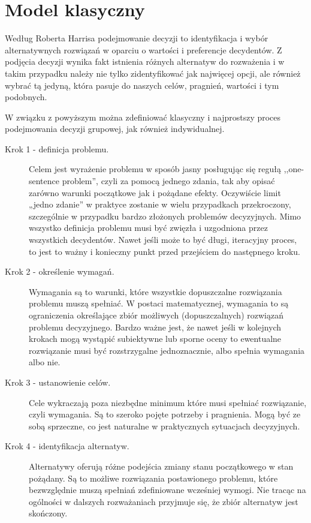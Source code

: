 \section{Model klasyczny}
Według Roberta Harrisa \cite{Harris2012, Harris2002} podejmowanie decyzji to
identyfikacja i wybór alternatywnych rozwiązań w oparciu o wartości i preferencje decydentów. Z
podjęcia decyzji wynika fakt istnienia różnych alternatyw do rozważenia i w
takim przypadku należy nie tylko zidentyfikować jak najwięcej opcji, ale również
wybrać tą jedyną, która pasuje do naszych celów, pragnień, wartości i tym
podobnych.

W związku z powyższym można zdefiniować klasyczny i najprostszy proces 
podejmowania decyzji grupowej, jak również indywidualnej.
\begin{description}
  \item[Krok 1 - definicja problemu.] Celem jest wyrażenie problemu w
  sposób jasny posługując się regułą ,,one-sentence problem'', czyli za pomocą
  jednego zdania, tak aby opisać zarówno warunki początkowe jak i pożądane
  efekty. Oczywiście limit „jedno zdanie” w praktyce zostanie w wielu
  przypadkach przekroczony, szczególnie w przypadku bardzo złożonych problemów 
  decyzyjnych. Mimo wszystko definicja problemu musi być zwięzła i uzgodniona
  przez wszystkich decydentów. Nawet jeśli może to być długi, iteracyjny proces,
  to jest to ważny i konieczny punkt przed przejściem do następnego kroku.
  
  \item[Krok 2 - określenie wymagań.] Wymagania są to warunki, które wszystkie
  dopuszczalne rozwiązania problemu muszą spełniać. W postaci matematycznej, 
  wymagania to są ograniczenia określające zbiór możliwych (dopuszczalnych) 
  rozwiązań problemu decyzyjnego. Bardzo ważne jest, że nawet jeśli w kolejnych 
  krokach mogą wystąpić subiektywne lub sporne oceny to ewentualne rozwiązanie 
  musi być rozstrzygalne jednoznacznie, albo spełnia wymagania albo nie.
  
  \item[Krok 3 - ustanowienie celów.] Cele wykraczają poza niezbędne minimum
  które musi spełniać rozwiązanie, czyli wymagania. Są to szeroko pojęte 
  potrzeby i pragnienia. Mogą być ze sobą sprzeczne, co jest naturalne w 
  praktycznych sytuacjach decyzyjnych.
  
  \item[Krok 4 - identyfikacja alternatyw.] Alternatywy oferują różne podejścia
  zmiany stanu początkowego w stan pożądany. Są to możliwe rozwiązania 
  postawionego problemu, które bezwzględnie muszą spełniań zdefiniowane 
  wcześniej wymogi. Nie tracąc na ogólności w dalszych rozważaniach przyjmuje 
  się, że zbiór alternatyw jest skończony.
  

\end{description}
